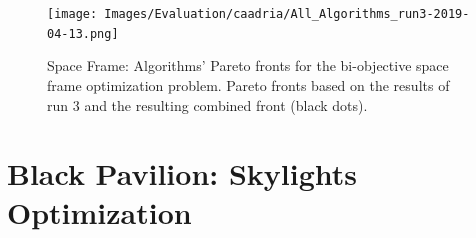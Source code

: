 \begin{figure}[h!]
	\centering
	\texttt{[image: Images/Evaluation/caadria/All\_Algorithms\_run3-2019-04-13.png]}
	\caption[Space Frame: Pareto Fronts for run 3]{Space Frame: Algorithms' Pareto fronts for the bi-objective space frame optimization problem. Pareto fronts based on the results of run $3$ and the resulting combined front (black dots).}
	\label{table:spaceframerun3}
\end{figure}

\clearpage
\section{Black Pavilion: Skylights Optimization}
\label{sec:blackpavilionextra}




